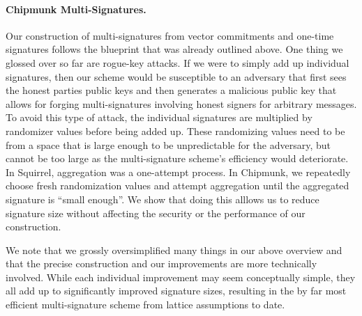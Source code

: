 \paragraph{Chipmunk Multi-Signatures.}
Our construction of multi-signatures from vector commitments and one-time signatures follows the blueprint that was already outlined above.
One thing we glossed over so far are rogue-key attacks.
If we were to simply add up individual signatures, then our scheme would be susceptible to an adversary that first sees the honest parties public keys and then generates a malicious public key that allows for forging multi-signatures involving honest signers for arbitrary messages.
To avoid this type of attack, the individual signatures are multiplied by randomizer values before being added up.
These randomizing values need to be from a space that is large enough to be unpredictable for the adversary, but cannot be too large as the multi-signature scheme's efficiency would deteriorate.
In Squirrel, aggregation was a one-attempt process.
In Chipmunk, we repeatedly choose fresh randomization values and attempt aggregation until the aggregated signature is ``small enough''.
We show that doing this alllows us to reduce signature size without affecting the security or the performance of our construction.

We note that we grossly oversimplified many things in our above overview and that the precise construction and our improvements are more technically involved.
While each individual improvement may seem conceptually simple, they all add up to significantly improved signature sizes, resulting in the by far most efficient multi-signature scheme from lattice assumptions to date.

